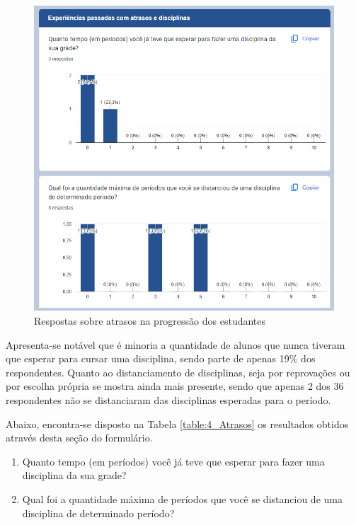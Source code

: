         \begin{figure}[htbp]\centering
            \caption{\label{fig:4_Atrasos} Respostas sobre atrasos na progressão dos estudantes}
            \includegraphics[scale=0.8]{files/img/forms/4.0-Atrasos.png}
        \end{figure} %


        Apresenta-se notável que é minoria a quantidade de alunos que nunca tiveram que esperar para cursar uma disciplina, sendo parte de apenas 19\% dos respondentes. Quanto ao distanciamento de disciplinas, seja por reprovações ou por escolha própria se mostra ainda mais presente, sendo que apenas 2 dos 36 respondentes não se distanciaram das disciplinas esperadas para o período.

        Abaixo, encontra-se disposto na Tabela \ref{table:4_Atrasos} os resultados obtidos através desta seção do formulário.
        
        \begin{enumerate}
            \item Quanto tempo (em períodos) você já teve que esperar para fazer uma disciplina da sua grade?
            \item Qual foi a quantidade máxima de períodos que você se distanciou de uma disciplina de determinado período?
        \end{enumerate}

